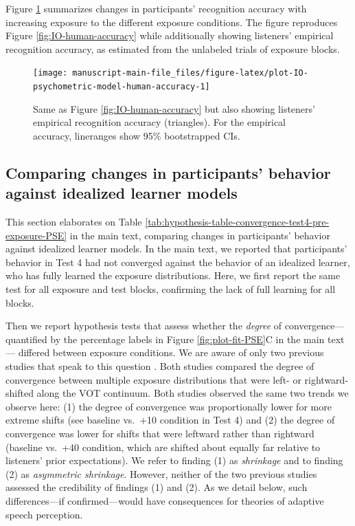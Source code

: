 \documentclass[
  11pt,
  man,mask,floatsintext]{apa6}
\begin{document}
Figure \ref{fig:plot-IO-psychometric-model-human-accuracy} summarizes changes in participants' recognition accuracy with increasing exposure to the different exposure conditions. The figure reproduces Figure \ref{fig:IO-human-accuracy} while additionally showing listeners' empirical recognition accuracy, as estimated from the unlabeled trials of exposure blocks.



\begin{figure}

{\centering \texttt{[image: manuscript-main-file\_files/figure-latex/plot-IO-psychometric-model-human-accuracy-1]} 

}

\caption{Same as Figure \ref{fig:IO-human-accuracy} but also showing listeners' empirical recognition accuracy (triangles). For the empirical accuracy, lineranges show 95\% bootstrapped CIs.}\label{fig:plot-IO-psychometric-model-human-accuracy}
\end{figure}

\subsection{Comparing changes in participants' behavior against idealized learner models}\label{sec:comparison-to-idealized-learners}

This section elaborates on Table \ref{tab:hypothesis-table-convergence-test4-pre-exposure-PSE} in the main text, comparing changes in participants' behavior against idealized learner models. In the main text, we reported that participants' behavior in Test 4 had not converged against the behavior of an idealized learner, who has fully learned the exposure distributions. Here, we first report the same test for all exposure and test blocks, confirming the lack of full learning for all blocks.

Then we report hypothesis tests that assess whether the \emph{degree} of convergence---quantified by the percentage labels in Figure \ref{fig:plot-fit-PSE}C in the main text--- differed between exposure conditions. We are aware of only two previous studies that speak to this question \autocite{kleinschmidt-jaeger2016,kleinschmidt2020}. Both studies compared the degree of convergence between multiple exposure distributions that were left- or rightward-shifted along the VOT continuum. Both studies observed the same two trends we observe here: (1) the degree of convergence was proportionally lower for more extreme shifts (see baseline vs.~+10 condition in Test 4) and (2) the degree of convergence was lower for shifts that were leftward rather than rightward (baseline vs.~+40 condition, which are shifted about equally far relative to listeners' prior expectations). We refer to finding (1) as \emph{shrinkage} and to finding (2) as \emph{asymmetric shrinkage}. However, neither of the two previous studies assessed the credibility of findings (1) and (2). As we detail below, such differences---if confirmed---would have consequences for theories of adaptive speech perception.
\end{document}
